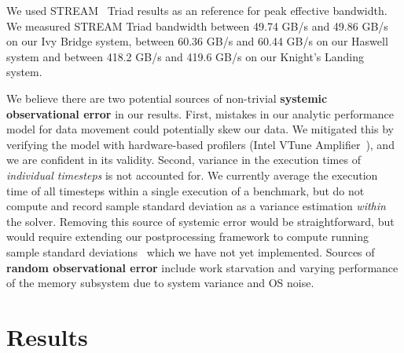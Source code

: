 \documentclass{sig-alternate-05-2015}
\begin{document}
We used STREAM~\cite{stream} Triad results as an reference for peak effective
  bandwidth.
We measured STREAM Triad bandwidth between 49.74 GB/s and 49.86 GB/s on our Ivy
  Bridge system, between 60.36 GB/s and 60.44 GB/s on our Haswell system and
  between 418.2 GB/s and 419.6 GB/s on our Knight's Landing system.

We believe there are two potential sources of non-trivial \textbf{systemic
  observational error} in our results.
First, mistakes in our analytic performance model for data movement could potentially
  skew our data.
We mitigated this by verifying the model with hardware-based
  profilers (Intel VTune Amplifier~\cite{intel_vtune_amplifier}), and we are confident
  in its validity.
Second, variance in the execution times of \emph{individual timesteps} is not
  accounted for.
We currently average the execution time of all timesteps
  within a single execution of a benchmark, but do not compute and record
  sample standard deviation as a variance estimation \emph{within} the solver.
Removing this source of systemic error would be straightforward, but
  would require extending our postprocessing framework to compute running 
  sample standard deviations~\cite{benchmarking_cpp_code} which we have not
  yet implemented.
Sources of \textbf{random observational error} include work starvation and
  varying performance of the memory subsystem due to system variance and OS
  noise.

\section{Results}
\label{sec:results}
\end{document}
